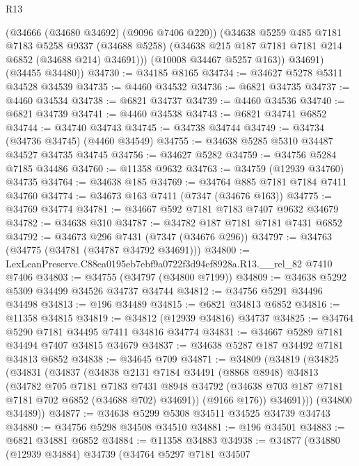 \begin{lexlean}{R13}
\begin{coremodule}
            (@34666 (@34680 @34692) (@9096 @7406 @220))
            (@34638
              @5259
              @485
              @7181
              @7183
              @5258
              @9337
              (@34688 @5258)
              (@34638 @215 @187 @7181 @7181 @214 @6852 (@34688 @214) @34691)))
          (@10008 @34467 @5257 @163))
        @34691)
      (@34455 @34480))
@34730 := @34185 @8165
@34734 := @34627 @5278 @5311 @34528 @34539
@34735 := @4460 @34532
@34736 := @6821 @34735
@34737 := @4460 @34534
@34738 := @6821 @34737
@34739 := @4460 @34536
@34740 := @6821 @34739
@34741 := @4460 @34538
@34743 := @6821 @34741 @6852
@34744 := @34740 @34743
@34745 := @34738 @34744
@34749 := @34734 (@34736 @34745) (@4460 @34549)
@34755 := @34638 @5285 @5310 @34487 @34527 @34735 @34745
@34756 := @34627 @5282
@34759 := @34756 @5284 @7185 @34486
@34760 := @11358 @9632
@34763 := @34759 (@12939 @34760) @34735
@34764 := @34638 @185
@34769 := @34764 @885 @7181 @7184 @7411 @34760
@34774 := @34673 @163 @7411 (@7347 (@34676 @163))
@34775 := @34769 @34774
@34781 := @34667 @592 @7181 @7183 @7407 @9632 @34679
@34782 := @34638 @310
@34787 := @34782 @187 @7181 @7181 @7431 @6852
@34792 := @34673 @296 @7431 (@7347 (@34676 @296))
@34797 := @34763 (@34775 (@34781 (@34787 @34792 @34691)))
@34800 := LexLeanPreserve.C88ea0195eb7ebf9a0722f3d94ef8928a.R13.__rel_82 @7410 @7406
@34803 := @34755 (@34797 (@34800 @7199))
@34809 := @34638 @5292 @5309 @34499 @34526 @34737 @34744
@34812 := @34756 @5291 @34496 @34498
@34813 := @196 @34489
@34815 := @6821 @34813 @6852
@34816 := @11358 @34815
@34819 := @34812 (@12939 @34816) @34737
@34825 := @34764 @5290 @7181 @34495 @7411 @34816 @34774
@34831 := @34667 @5289 @7181 @34494 @7407 @34815 @34679
@34837 := @34638 @5287 @187 @34492 @7181 @34813 @6852
@34838 := @34645 @709
@34871 := @34809
    (@34819
      (@34825
        (@34831
          (@34837
            (@34838
              @2131
              @7184
              @34491
              (@8868 @8948)
              @34813
              (@34782
                @705
                @7181
                @7183
                @7431
                @8948
                @34792
                (@34638 @703 @187 @7181 @7181 @702 @6852 (@34688 @702) @34691))
              (@9166 @176))
            @34691)))
      (@34800 @34489))
@34877 := @34638 @5299 @5308 @34511 @34525 @34739 @34743
@34880 := @34756 @5298 @34508 @34510
@34881 := @196 @34501
@34883 := @6821 @34881 @6852
@34884 := @11358 @34883
@34938 := @34877
    (@34880
      (@12939 @34884)
      @34739
      (@34764
        @5297
        @7181
        @34507

\end{coremodule}
\end{lexlean}
